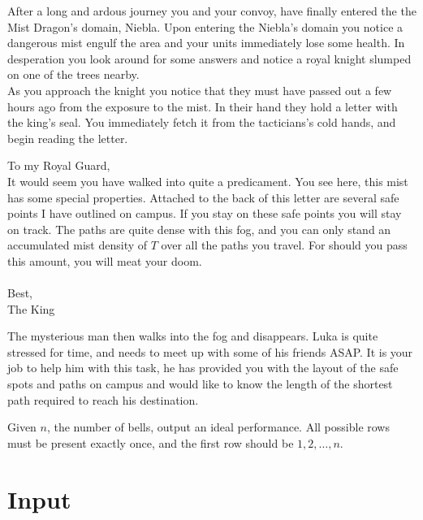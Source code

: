 


After a long and ardous journey you and your convoy, have finally entered the the Mist Dragon's domain, Niebla. Upon
entering the Niebla's domain you notice a dangerous mist engulf the area and your units immediately lose some health. In
desperation you look around for some answers and notice a royal knight slumped on one of the trees nearby. \\

As you approach the knight you notice that they must have passed out a few hours ago from the exposure to the mist. In
their hand they hold a letter with the king's seal. You immediately fetch it from the tacticians's cold hands, and begin
reading the letter. \\

\begin{minipage}[t]{6in}
To my Royal Guard, \\

It would seem you have walked into quite a predicament.  You see here, this mist has some special properties. Attached
to the back of this letter are several safe points I have outlined on campus. If you stay on these safe points you will
stay on track. The paths are quite dense with this fog, and you can only stand an accumulated mist density of $T$ over
all the paths you travel. For should you pass this amount, you will meat your doom. \\ \\
Best,\\
The King \\
\end{minipage}


The mysterious man then walks into the fog and disappears. Luka is quite stressed for time, and needs to meet up with some of his friends ASAP. It is your job to help him with this task, he has provided you with the layout of the safe spots and paths on campus and would like to know the length of the shortest path required to reach his destination.

Given $n$, the number of bells, output an ideal performance. All possible rows must be present
exactly once, and the first row should be $1, 2, \dots, n$.


\section*{Input}

